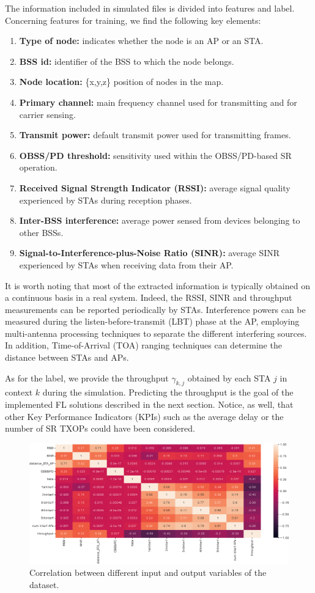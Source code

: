 \documentclass[10pt,a4paper,twocolumn]{article}
\newcommand{\ITUpar}{\vspace{8pt}\par}
\def\startfigure{\vspace{6pt}\begin{figure}[ht]\center}
\begin{document}
The information included in simulated files is divided into features and label. Concerning features for training, we find the following key elements:
\begin{enumerate}
	\item \textbf{Type of node:} indicates whether the node is an AP or an STA.
	\item \textbf{BSS id:} identifier of the BSS to which the node belongs.
	\item \textbf{Node location:} \{x,y,z\} position of nodes in the map.
	\item \textbf{Primary channel:} main frequency channel used for transmitting and for carrier sensing.
	\item \textbf{Transmit power:} default transmit power used for transmitting frames.
	\item \textbf{OBSS/PD threshold:} sensitivity used within the OBSS/PD-based SR operation.
	\item \textbf{Received Signal Strength Indicator (RSSI):} average signal quality experienced by STAs during reception phases.
	\item \textbf{Inter-BSS interference:} average power sensed from devices belonging to other BSSs.
	\item \textbf{Signal-to-Interference-plus-Noise Ratio (SINR):} average SINR experienced by STAs when receiving data from their AP.
\end{enumerate}

It is worth noting that most of the extracted information is typically obtained on a continuous basis in a real system. Indeed, the RSSI, SINR and throughput measurements can be reported periodically by STAs. Interference powers can be measured during the listen-before-transmit (LBT) phase at the AP, employing multi-antenna processing techniques to separate the different interfering sources. In addition, Time-of-Arrival (TOA) ranging techniques can determine the distance between STAs and APs.\ITUpar

As for the label, we provide the throughput $\gamma_{k,j}$ obtained by each STA $j$ in context $k$ during the simulation. Predicting the throughput is the goal of the implemented FL solutions described in the next section. Notice, as well, that other Key Performance Indicators (KPIs) such as the average delay or the number of SR TXOPs could have been considered.\ITUpar

\begin{figure}[t!]
	\centering
	\includegraphics[width=.8\linewidth]{img/Correlation_heatmap_r.eps}
	\caption{Correlation between different input and output variables of the dataset.}
	\label{fig:Correlation heatmap}
\end{figure}
\end{document}
